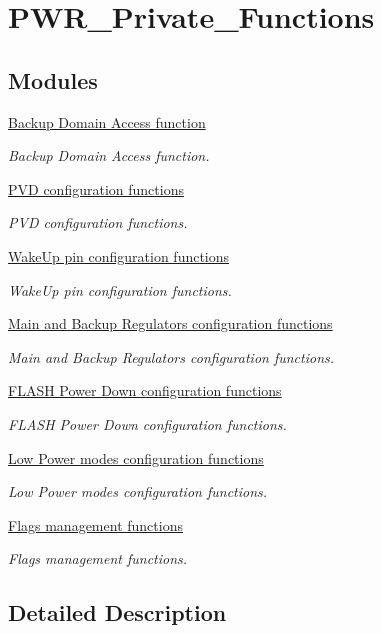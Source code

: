 \hypertarget{group___p_w_r___private___functions}{}\section{P\+W\+R\+\_\+\+Private\+\_\+\+Functions}
\label{group___p_w_r___private___functions}
\subsection*{Modules}
\begin{DoxyCompactItemize}
\item 
\hyperlink{group___p_w_r___group1}{Backup Domain Access function}
\begin{DoxyCompactList}\small\item\em Backup Domain Access function. \end{DoxyCompactList}\item 
\hyperlink{group___p_w_r___group2}{P\+V\+D configuration functions}
\begin{DoxyCompactList}\small\item\em P\+V\+D configuration functions. \end{DoxyCompactList}\item 
\hyperlink{group___p_w_r___group3}{Wake\+Up pin configuration functions}
\begin{DoxyCompactList}\small\item\em Wake\+Up pin configuration functions. \end{DoxyCompactList}\item 
\hyperlink{group___p_w_r___group4}{Main and Backup Regulators configuration functions}
\begin{DoxyCompactList}\small\item\em Main and Backup Regulators configuration functions. \end{DoxyCompactList}\item 
\hyperlink{group___p_w_r___group5}{F\+L\+A\+S\+H Power Down configuration functions}
\begin{DoxyCompactList}\small\item\em F\+L\+A\+S\+H Power Down configuration functions. \end{DoxyCompactList}\item 
\hyperlink{group___p_w_r___group6}{Low Power modes configuration functions}
\begin{DoxyCompactList}\small\item\em Low Power modes configuration functions. \end{DoxyCompactList}\item 
\hyperlink{group___p_w_r___group7}{Flags management functions}
\begin{DoxyCompactList}\small\item\em Flags management functions. \end{DoxyCompactList}\end{DoxyCompactItemize}


\subsection{Detailed Description}
